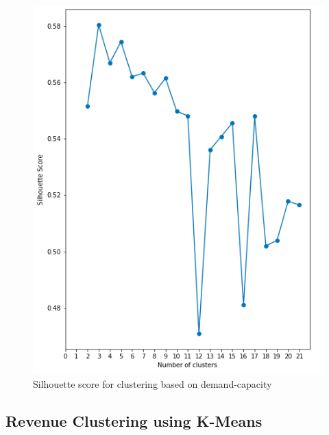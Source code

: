 \begin{figure}[H]
   \centering
    \includegraphics[width=0.8\linewidth]{./Figures/BC_ABB1.png}
    \caption{Silhouette score for clustering based on demand-capacity}
    \label{BCABB1}
\end{figure}

\subsection*{Revenue Clustering using K-Means}
\label{app:A3}

